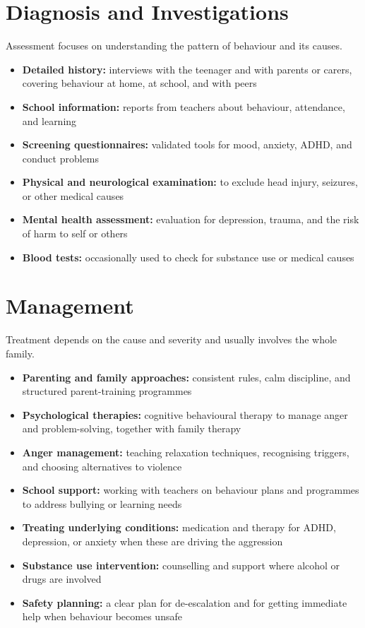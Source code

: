 \section*{Diagnosis and Investigations}
Assessment focuses on understanding the pattern of behaviour and its causes.

\begin{itemize}
    \item \textbf{Detailed history:} interviews with the teenager and with parents or carers, covering behaviour at home, at school, and with peers
    \item \textbf{School information:} reports from teachers about behaviour, attendance, and learning
    \item \textbf{Screening questionnaires:} validated tools for mood, anxiety, ADHD, and conduct problems
    \item \textbf{Physical and neurological examination:} to exclude head injury, seizures, or other medical causes
    \item \textbf{Mental health assessment:} evaluation for depression, trauma, and the risk of harm to self or others
    \item \textbf{Blood tests:} occasionally used to check for substance use or medical causes
\end{itemize}

\section*{Management}
Treatment depends on the cause and severity and usually involves the whole family.

\begin{itemize}
    \item \textbf{Parenting and family approaches:} consistent rules, calm discipline, and structured parent-training programmes
    \item \textbf{Psychological therapies:} cognitive behavioural therapy to manage anger and problem-solving, together with family therapy
    \item \textbf{Anger management:} teaching relaxation techniques, recognising triggers, and choosing alternatives to violence
    \item \textbf{School support:} working with teachers on behaviour plans and programmes to address bullying or learning needs
    \item \textbf{Treating underlying conditions:} medication and therapy for ADHD, depression, or anxiety when these are driving the aggression
    \item \textbf{Substance use intervention:} counselling and support where alcohol or drugs are involved
    \item \textbf{Safety planning:} a clear plan for de-escalation and for getting immediate help when behaviour becomes unsafe
\end{itemize}

